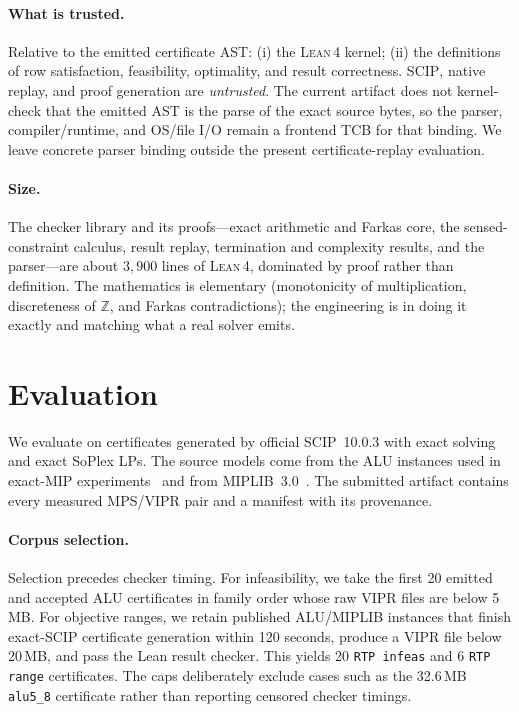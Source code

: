 \documentclass[runningheads]{llncs}
\newcommand{\code}[1]{\texttt{#1}}
\newcommand{\Z}{\mathbb{Z}}
\newcommand{\scip}{\textsc{SCIP}}
\newcommand{\lean}{\textsc{Lean\,4}}
\begin{document}
\paragraph{What is trusted.} Relative to the emitted certificate AST: (i) the
\lean{} kernel; (ii) the definitions of row satisfaction, feasibility, optimality, and
result correctness. \scip{}, native replay, and proof generation are
\emph{untrusted}. The current artifact does not kernel-check
that the emitted AST is the parse of the exact source bytes, so the parser,
compiler/runtime, and OS/file I/O remain a frontend TCB for that binding. We leave
concrete parser binding outside the present certificate-replay evaluation.

\paragraph{Size.} The checker library and its proofs---exact arithmetic and Farkas core,
the sensed-constraint calculus, result replay, termination and complexity results, and
the parser---are about $3{,}900$ lines of \lean{}, dominated by proof rather than
definition. The mathematics is elementary (monotonicity of multiplication, discreteness
of $\Z$, and Farkas contradictions); the engineering is in doing it exactly and matching
what a real solver emits.

\section{Evaluation}\label{sec:eval}

We evaluate on certificates generated by official \scip~10.0.3 with exact solving and
exact SoPlex LPs. The source models come from the ALU instances used in exact-MIP
experiments~\cite{exactmip} and from MIPLIB~3.0~\cite{miplib3}. The submitted artifact
contains every measured MPS/VIPR pair and a manifest with its provenance.

\paragraph{Corpus selection.} Selection precedes checker timing. For infeasibility, we
take the first 20 emitted and accepted ALU certificates in family order whose raw VIPR
files are below 5\,MB. For objective ranges, we retain published ALU/MIPLIB instances
that finish exact-\scip{} certificate generation within 120 seconds, produce a VIPR file
below 20\,MB, and pass the Lean result checker. This yields 20
\code{RTP infeas} and 6 \code{RTP range} certificates. The caps deliberately exclude
cases such as the 32.6\,MB \code{alu5\_8} certificate rather than reporting censored
checker timings.
\end{document}
